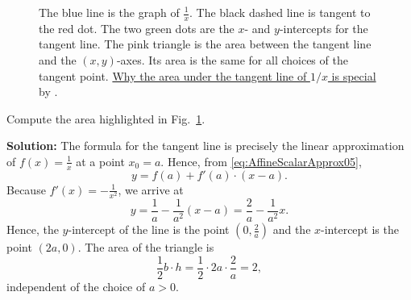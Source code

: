 \begin{figure}[htb]%
\centering
{}%
\hfill
{}%
\hfill
{}%
\hfill
    \caption[]{The blue line is the graph of $\frac{1}{x}$. The black dashed line is tangent to the red dot. The two green dots are the $x$- and $y$-intercepts for the tangent line. The pink triangle is the area between the tangent line and the $(x,y)$-axes. Its area is the same for all choices of the tangent point. \href{https://youtu.be/Nq6E8EeePVk}{Why the area under the tangent line of $1/x$ is special} by \bprp. }
    \label{fig:AreaAlwaysTwo}
\end{figure}

\vspace*{.2cm}

\begin{example} Compute the area highlighted in Fig.~\ref{fig:AreaAlwaysTwo}.
    
\end{example}
\textbf{Solution:} The formula for the tangent line is precisely the linear approximation of $f(x)=\frac{1}{x}$ at a point $x_0=a$. Hence, from \eqref{eq:AffineScalarApprox05},
$$y = f(a) + f'(a) \cdot (x - a).$$
Because $f'(x) =-\frac{1}{x^2}$, we arrive at 
$$y = \frac{1}{a} - \frac{1}{a^2} (x - a) =  \frac{2}{a} - \frac{1}{a^2} x. $$
Hence, the $y$-intercept of the line is the point $(0, \frac{2}{a})$ and the $x$-intercept is the point $(2a, 0)$. The area of the triangle is
$$\frac{1}{2} b \cdot h = \frac{1}{2} \cdot 2a \cdot  \frac{2}{a} = 2,$$
independent of the choice of $a>0$. 

